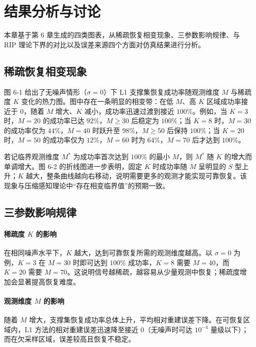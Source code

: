 \documentclass[UTF8]{ctexart}
\numberwithin{figure}{section}
\theoremstyle{definition}
\theoremstyle{examplestyle}
\theoremstyle{remark}
\begin{document}
\section{结果分析与讨论}
\label{sec:results}

本章基于第 6 章生成的四类图表，从稀疏恢复相变现象、三参数影响规律、与 RIP 理论下界的对比以及误差来源四个方面对仿真结果进行分析。

\subsection{稀疏恢复相变现象}
\label{sec:phase-transition}

图 6-1 给出了无噪声情形（$\sigma=0$）下 L1 支撑集恢复成功率随观测维度 $M$ 与稀疏度 $K$ 变化的热力图。图中存在一条明显的相变带：在低 $M$、高 $K$ 区域成功率接近于 $0$，随着 $M$ 增大、$K$ 减小，成功率迅速过渡到接近 $100\%$。例如，当 $K=3$ 时，$M=20$ 的成功率已达 $92\%$，$M\ge30$ 后稳定为 $100\%$；当 $K=8$ 时，$M=30$ 的成功率仅为 $44\%$，$M=40$ 时跃升至 $98\%$，$M\ge50$ 后保持 $100\%$；当 $K=20$ 时，$M=50$ 的成功率仅为 $12\%$，$M=60$ 时为 $64\%$，$M=70$ 后才达到 $100\%$。

若记临界观测维度 $M^*$ 为成功率首次达到 $100\%$ 的最小 $M$，则 $M^*$ 随 $K$ 的增大而单调增大。图 6-2 的折线图进一步表明，固定 $K$ 时成功率随 $M$ 呈明显的 $S$ 型上升；$K$ 越大，整条曲线越向右移动，说明需要更多的观测才能实现可靠恢复。该现象与压缩感知理论中“存在相变临界值”的预期一致。

\subsection{三参数影响规律}
\label{sec:param-effects}

\paragraph*{稀疏度 $K$ 的影响}
在相同噪声水平下，$K$ 越大，达到可靠恢复所需的观测维度越高。以 $\sigma=0$ 为例，$K=3$ 在 $M=30$ 时即可达到 $100\%$ 成功率，$K=8$ 需要 $M=40$，而 $K=20$ 需要 $M=70$。这说明信号越稀疏，越容易从少量观测中恢复；稀疏度增加会显著提高恢复难度。

\paragraph*{观测维度 $M$ 的影响}
随着 $M$ 增大，支撑集恢复成功率总体上升，平均相对重建误差下降。在可恢复区域内，L1 方法的相对重建误差迅速降至接近 $0$（无噪声时可达 $10^{-4}$ 量级以下）；而在欠采样区域，误差较高且恢复不稳定。
\end{document}
